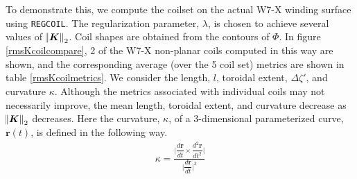 \documentclass[aps,unsortedaddress]{revtex4-1}
\newcommand{\der}[2]{\dfrac{d #1}{d  #2}}
\begin{document}
To demonstrate this, we compute the coilset on the actual W7-X winding surface using \texttt{REGCOIL}. The regularization parameter, $\lambda$, is chosen to achieve several values of $\norm{\bm{K}}_2$. Coil shapes are obtained from the contours of $\Phi$. In figure \ref{rmsKcoilcompare}, 2 of the W7-X non-planar coils computed in this way are shown, and the corresponding average (over the 5 coil set) metrics are shown in table \ref{rmsKcoilmetrics}. We consider the length, $l$, toroidal extent, $\Delta \zeta'$, and curvature $\kappa$. Although the metrics associated with individual coils may not necessarily improve, the mean length, toroidal extent, and curvature decrease as $\norm{\bm{K}}_2$ decreases. Here the curvature, $\kappa$, of a 3-dimensional parameterized curve, $\bm{r}(t)$, is defined in the following way.
\begin{gather}
\kappa = \frac{\bigg \rvert \der{\bm{r}}{t} \times \der{^2 \bm{r}}{t^2} \bigg \rvert}{\bigg \rvert \der{\bm{r}}{t} \bigg \rvert^3}
\end{gather}
\end{document}

